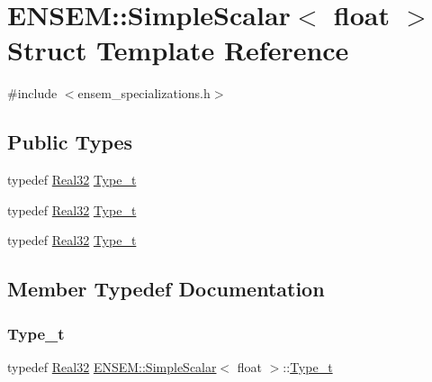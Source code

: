 \hypertarget{structENSEM_1_1SimpleScalar_3_01float_01_4}{}\section{E\+N\+S\+EM\+:\+:Simple\+Scalar$<$ float $>$ Struct Template Reference}
\label{structENSEM_1_1SimpleScalar_3_01float_01_4}


{\ttfamily \#include $<$ensem\+\_\+specializations.\+h$>$}

\subsection*{Public Types}
\begin{DoxyCompactItemize}
\item 
typedef \mbox{\hyperlink{group__defs_gab601f1c55eb75baed0a0859b3fec6bc1}{Real32}} \mbox{\hyperlink{structENSEM_1_1SimpleScalar_3_01float_01_4_a941f810256ed04a2e1880d93b6d09c9b}{Type\+\_\+t}}
\item 
typedef \mbox{\hyperlink{group__defs_gab601f1c55eb75baed0a0859b3fec6bc1}{Real32}} \mbox{\hyperlink{structENSEM_1_1SimpleScalar_3_01float_01_4_a941f810256ed04a2e1880d93b6d09c9b}{Type\+\_\+t}}
\item 
typedef \mbox{\hyperlink{group__defs_gab601f1c55eb75baed0a0859b3fec6bc1}{Real32}} \mbox{\hyperlink{structENSEM_1_1SimpleScalar_3_01float_01_4_a941f810256ed04a2e1880d93b6d09c9b}{Type\+\_\+t}}
\end{DoxyCompactItemize}


\subsection{Member Typedef Documentation}
\mbox{\label{structENSEM_1_1SimpleScalar_3_01float_01_4_a941f810256ed04a2e1880d93b6d09c9b}} 
\subsubsection{\texorpdfstring{Type\_t}{Type\_t}\hspace{0.1cm}{\footnotesize\ttfamily [1/3]}}
{\footnotesize\ttfamily typedef \mbox{\hyperlink{group__defs_gab601f1c55eb75baed0a0859b3fec6bc1}{Real32}} \mbox{\hyperlink{structENSEM_1_1SimpleScalar}{E\+N\+S\+E\+M\+::\+Simple\+Scalar}}$<$ float $>$\+::\mbox{\hyperlink{structENSEM_1_1SimpleScalar_3_01float_01_4_a941f810256ed04a2e1880d93b6d09c9b}{Type\+\_\+t}}}

